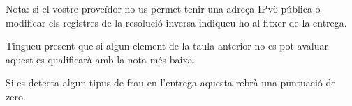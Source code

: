 \documentclass{practicaitic}
\begin{document}
Nota: si el vostre proveïdor no us permet tenir una adreça IPv6 pública o
modificar els registres de la resolució inversa indiqueu-ho al fitxer de la
entrega.

Tingueu present que si algun element de la taula anterior no es pot avaluar
aquest es qualificarà amb la nota més baixa.

Si es detecta algun tipus de frau en l'entrega aquesta rebrà una puntuació de zero.
\end{document}
